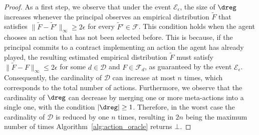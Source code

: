 \finaliterations*
\begin{proof}
	
	As a first step, we observe that under the event $\mathcal{E}_\epsilon$, the size of $\dreg$ increases whenever the principal observes an empirical distribution $\widetilde{F}$ that satisfies $\| \widetilde{F} - \widetilde{F}' \|_{\infty} \ge 2 \epsilon$ for every $\widetilde{F}' \in \mathcal{F}$. This condition holds when the agent chooses an action that has not been selected before. This is because, if the principal commits to a contract implementing an action the agent has already played, the resulting estimated empirical distribution $\widetilde{F}$ must satisfy $\| \widetilde{F} - F \|_{\infty} \le 2 \epsilon$ for some $d \in \mathcal{D}$ and $F \in \mathcal{F}_{d}$, as guaranteed by the event $\mathcal{E}_{\epsilon}$. Consequently, the cardinality of $\mathcal{D}$ can increase at most $n$ times, which corresponds to the total number of actions. Furthermore, we observe that the cardinality of $\dreg$ can decrease by merging one or more meta-actions into a single one, with the condition $|\dreg| \geq 1$. Therefore, in the worst case the cardinality of $\mathcal{D}$ is reduced by one $n$ times, resulting in $2 n $ being the maximum number of times Algorithm~\ref{alg:action_oracle} returns $\bot$.
\end{proof}



